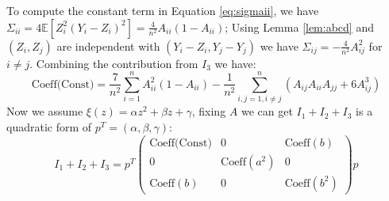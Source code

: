 \documentclass{article}
\def\E{\mathbb{E}}
\begin{document}
To compute the constant term in Equation \eqref{eq:sigmaii}, we have $\Sigma_{ii} = 4\E[Z_i^2 (Y_i-Z_i)^2] = \frac{4}{n^2} A_{ii}(1-A_{ii})$;
Using Lemma \ref{lem:abcd} and $(Z_i, Z_j)$ are independent with $(Y_i - Z_i, Y_j - Y_j)$ we have $\Sigma_{ij} = -\frac{4}{n^2} A_{ij}^2$ for $i \neq j$. Combining the contribution from $I_3$ we have:
\begin{equation}
\textrm{Coeff(Const)} = \frac{7}{n^2} \sum_{i=1}^n A^2_{ii} (1 -A_{ii}) - \frac{1}{n^2} \sum_{i,j=1,i\neq j}^n (A_{ij}A_{ii}A_{jj} + 6 A_{ij}^3)
\end{equation}
Now we assume $\xi(z) = \alpha z^2 + \beta z + \gamma$, fixing $A$ we can get $I_1 + I_2 + I_3$ is a quadratic form of $p^T = (\alpha, \beta, \gamma)$:
$$
I_1 + I_2 + I_3 =p^T \begin{pmatrix} 
\textrm{Coeff(Const)}  & 0 & \textrm{Coeff}(b) \\ 
0  & \textrm{Coeff}(a^2) & 0 \\ 
\textrm{Coeff}(b)   & 0 & \textrm{Coeff}(b^2) 
\end{pmatrix} p
$$
\end{document}
